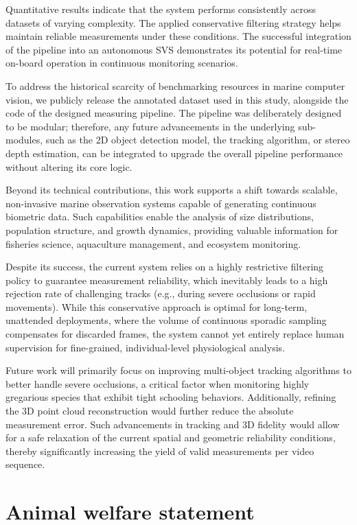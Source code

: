 \documentclass[utf8]{FrontiersinHarvard} %
\begin{document}
Quantitative results indicate that the system performs consistently across datasets of varying complexity. The applied conservative filtering strategy helps maintain reliable measurements under these conditions. The successful integration of the pipeline into an autonomous SVS demonstrates its potential for real-time on-board operation in continuous monitoring scenarios.

To address the historical scarcity of benchmarking resources in marine computer vision, we publicly release the annotated dataset used in this study, alongside the code of the designed measuring pipeline. The pipeline was deliberately designed to be modular; therefore, any future advancements in the underlying sub-modules, such as the 2D object detection model, the tracking algorithm, or stereo depth estimation, can be integrated to upgrade the overall pipeline performance without altering its core logic.


Beyond its technical contributions, this work supports a shift towards scalable, non-invasive marine observation systems capable of generating continuous biometric data. Such capabilities enable the analysis of size distributions, population structure, and growth dynamics, providing valuable information for fisheries science, aquaculture management, and ecosystem monitoring. 

Despite its success, the current system relies on a highly restrictive filtering policy to guarantee measurement reliability, which inevitably leads to a high rejection rate of challenging tracks (e.g., during severe occlusions or rapid movements). While this conservative approach is optimal for long-term, unattended deployments, where the volume of continuous sporadic sampling compensates for discarded frames, the system cannot yet entirely replace human supervision for fine-grained, individual-level physiological analysis. 


Future work will primarily focus on improving multi-object tracking algorithms to better handle severe occlusions, a critical factor when monitoring highly gregarious species that exhibit tight schooling behaviors. Additionally, refining the 3D point cloud reconstruction would further reduce the absolute measurement error. Such advancements in tracking and 3D fidelity would allow for a safe relaxation of the current spatial and geometric reliability conditions, thereby significantly increasing the yield of valid measurements per video sequence. 

\section*{Animal welfare statement}
\end{document}

